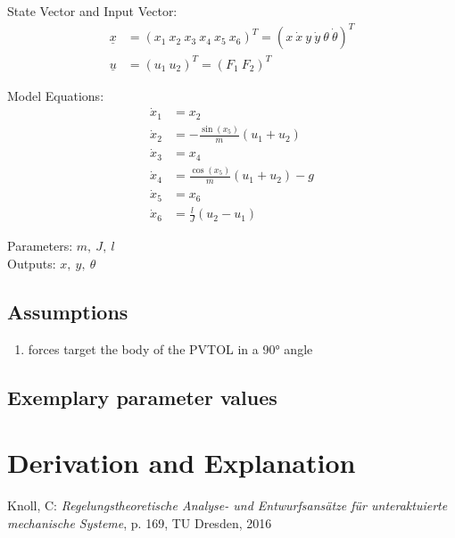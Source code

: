 \documentclass[10pt,a4paper]{article}
\begin{document}
	State Vector and Input Vector:
	\begin{align*}
		\underline{x} &= (x_1 \ x_2 \ x_3 \ x_4 \ x_5 \ x_6)^T = (x \ \dot{x} \ y \ \dot{y} \ \theta \ \dot{\theta})^T \\
		\underline{u} &= (u_1 \ u_2)^T = (F_1 \ F_2)^T
	\end{align*}

	\noindent Model Equations:	
	\begin{subequations}
	\begin{align}
		\dot{x}_1 &= x_2 	\\ 
		\dot{x}_2 &= -\frac{\sin(x_5)}{m} (u_1 + u_2)  \\
		\dot{x}_3 &= x_4 \\
		\dot{x}_4 &= \frac{\cos(x_5)}{m} (u_1 + u_2) - g \\
		\dot{x}_5 &= x_6 \\
		\dot{x}_6 &= \frac{l}{J} (u_2 - u_1)
	\end{align}
	\end{subequations}

	\noindent
	Parameters: $m, ~J, ~l$ %
	\\
	Outputs:  $x, ~y, ~\theta$%
	
	
	\subsection{Assumptions} %
		\begin{enumerate} %
			\item forces target the body of the PVTOL in a 90° angle
		\end{enumerate}
	
	
	\subsection{Exemplary parameter values}
	

	
	\section{Derivation and Explanation} %
	
	
	\begin{thebibliography}{10}		
		Knoll, C: 
		\textit{Regelungstheoretische Analyse- und Entwurfsansätze für unteraktuierte mechanische Systeme}, p. 169, TU Dresden, 2016
	\end{thebibliography}
\end{document}
